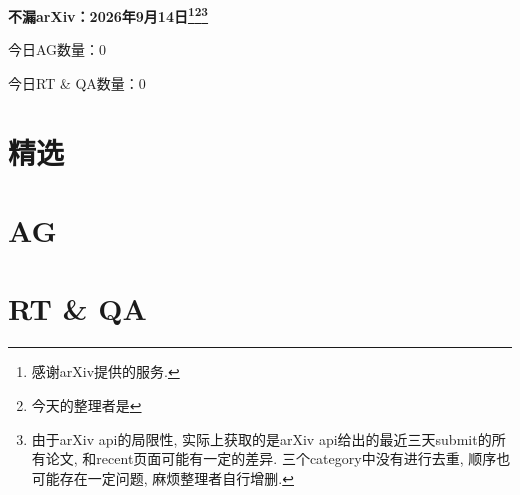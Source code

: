 \documentclass[9pt, a4paper]{article}
\theoremstyle{plain}
\theoremstyle{definition}
\theoremstyle{remark}
\newcommand{\AGnumber}{0}
\newcommand{\RTQAnumber}{0}
\newcommand{\NewestDate}{2026年9月14日}
\newcommand{\todayarXiver}{} %
\begin{document}
\begin{center}
    \Huge\textbf{不漏arXiv：\NewestDate\footnote{感谢arXiv提供的服务.}\footnote{今天的整理者是\todayarXiver}\footnote{由于arXiv api的局限性, 实际上获取的是arXiv api给出的最近三天submit的所有论文, 和recent页面可能有一定的差异. 三个category中没有进行去重, 顺序也可能存在一定问题, 麻烦整理者自行增删.}} \\
\end{center}

\setcounter{section}{-1}

\begin{center}
    今日AG数量：\AGnumber
    
    今日RT \& QA数量：\RTQAnumber
    
\end{center}


\section{精选}


\section{AG}

\section{RT \& QA}
\end{document}
